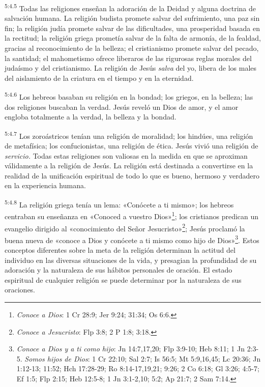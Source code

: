 \par
\textsuperscript{5:4.5} Todas las religiones enseñan la adoración de la Deidad y alguna doctrina de salvación humana. La religión budista promete salvar del sufrimiento, una paz sin fin; la religión judía promete salvar de las dificultades, una prosperidad basada en la rectitud; la religión griega prometía salvar de la falta de armonía, de la fealdad, gracias al reconocimiento de la belleza; el cristianismo promete salvar del pecado, la santidad; el mahometismo ofrece liberaros de las rigurosas reglas morales del judaísmo y del cristianismo. La religión de Jesús \textit{salva} del yo, libera de los males del aislamiento de la criatura en el tiempo y en la eternidad.

\par
\textsuperscript{5:4.6} Los hebreos basaban su religión en la bondad; los griegos, en la belleza; las dos religiones buscaban la verdad. Jesús reveló un Dios de amor, y el amor engloba totalmente a la verdad, la belleza y la bondad.

\par
\textsuperscript{5:4.7} Los zoroástricos tenían una religión de moralidad; los hindúes, una religión de metafísica; los confucionistas, una religión de ética. Jesús vivió una religión de \textit{servicio.} Todas estas religiones son valiosas en la medida en que se aproximan válidamente a la religión de Jesús. La religión está destinada a convertirse en la realidad de la unificación espiritual de todo lo que es bueno, hermoso y verdadero en la experiencia humana.

\par
\textsuperscript{5:4.8} La religión griega tenía un lema: «Conócete a ti mismo»; los hebreos centraban su enseñanza en «Conoced a vuestro Dios»\footnote{\textit{Conoce a Dios}: 1 Cr 28:9; Jer 9:24; 31:34; Os 6:6.}; los cristianos predican un evangelio dirigido al «conocimiento del Señor Jesucristo»\footnote{\textit{Conoce a Jesucristo}: Flp 3:8; 2 P 1:8; 3:18.}; Jesús proclamó la buena nueva de «conoce a Dios y conócete a ti mismo como hijo de Dios»\footnote{\textit{Conoce a Dios y a ti como hijo}: Jn 14:7,17,20; Flp 3:9-10; Heb 8:11; 1 Jn 2:3-5. \textit{Somos hijos de Dios}: 1 Cr 22:10; Sal 2:7; Is 56:5; Mt 5:9,16,45; Lc 20:36; Jn 1:12-13; 11:52; Hch 17:28-29; Ro 8:14-17,19,21; 9:26; 2 Co 6:18; Gl 3:26; 4:5-7; Ef 1:5; Flp 2:15; Heb 12:5-8; 1 Jn 3:1-2,10; 5:2; Ap 21:7; 2 Sam 7:14.}. Estos conceptos diferentes sobre la meta de la religión determinan la actitud del individuo en las diversas situaciones de la vida, y presagian la profundidad de su adoración y la naturaleza de sus hábitos personales de oración. El estado espiritual de cualquier religión se puede determinar por la naturaleza de sus oraciones.

